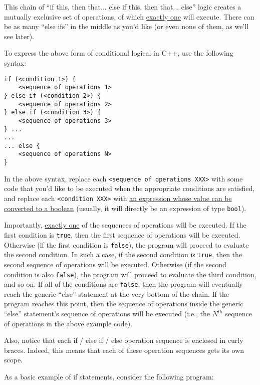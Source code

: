 \documentclass{article}
\begin{document}
This chain of ``if this, then that... else if this, then that... else'' logic creates a mutually exclusive set of operations, of which \ul{exactly one} will execute. There can be as many ``else ifs'' in the middle as you'd like (or even none of them, as we'll see later).

To express the above form of conditional logical in C++, use the following syntax:

\begin{verbatim}
if (<condition 1>) {
    <sequence of operations 1>
} else if (<condition 2>) {
    <sequence of operations 2>
} else if (<condition 3>) {
    <sequence of operations 3>
} ...
...
... else {
    <sequence of operations N>
}
\end{verbatim}

In the above syntax, replace each \texttt{<sequence of operations XXX>} with some code that you'd like to be executed when the appropriate conditions are satisfied, and replace each \texttt{<condition XXX>} with \ul{an expression whose value can be converted to a boolean} (usually, it will directly be an expression of type \texttt{bool}).

Importantly, \ul{exactly one} of the sequences of operations will be executed. If the first condition is \texttt{true}, then the first sequence of operations will be executed. Otherwise (if the first condition is \texttt{false}), the program will proceed to evaluate the second condition. In such a case, if the second condition is \texttt{true}, then the second sequence of operations will be executed. Otherwise (if the second condition is also \texttt{false}), the program will proceed to evaluate the third condition, and so on. If all of the conditions are \texttt{false}, then the program will eventually reach the generic ``else'' statement at the very bottom of the chain. If the program reaches this point, then the sequence of operations inside the generic ``else'' statement's sequence of operations will be executed (i.e., the $N^{th}$ sequence of operations in the above example code).

Also, notice that each if / else if / else operation sequence is enclosed in curly braces. Indeed, this means that each of these operation sequences gets its own scope.

As a basic example of if statements, consider the following program:
\end{document}
